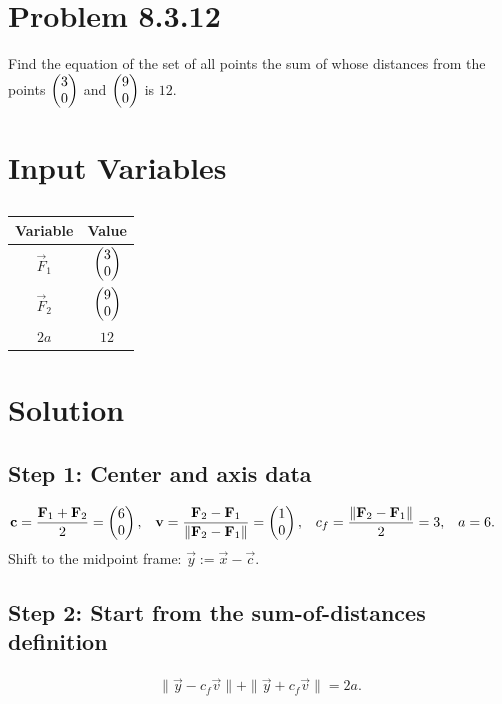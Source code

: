 \documentclass[12pt]{article}
\begin{document}
\section*{Problem 8.3.12}
Find the equation of the set of all points the sum of whose distances 
from the points $\begin{pmatrix}3\\0\end{pmatrix}$ and $\begin{pmatrix}9\\0\end{pmatrix}$ is $12$.

\section*{Input Variables}
\begin{table}[H]
\centering
\begin{tabular}{|c|c|}
\hline
Variable & Value \\
\hline
$\vec F_1$ & $\begin{pmatrix}3\\0\end{pmatrix}$ \\
\hline
$\vec F_2$ & $\begin{pmatrix}9\\0\end{pmatrix}$ \\
\hline
$2a$ & $12$ \\
\hline
\end{tabular}
\caption{} \label{}
\end{table}

\section*{Solution}

\subsection*{Step 1: Center and axis data}
\begin{align}
\mathbf c &= \frac{\mathbf F_1+\mathbf F_2}{2}=\begin{pmatrix}6\\0\end{pmatrix}, &
\mathbf v &= \frac{\mathbf F_2-\mathbf F_1}{\|\mathbf F_2-\mathbf F_1\|}=\begin{pmatrix}1\\0\end{pmatrix}, &
c_f &= \frac{\|\mathbf F_2-\mathbf F_1\|}{2}=3, &
a &= 6.
\end{align}
Shift to the midpoint frame: $\vec y:=\vec x-\vec c$.

\subsection*{Step 2: Start from the sum-of-distances definition}
\begin{align}
\|\vec y-c_f\vec v\|+\|\vec y+c_f\vec v\|=2a.
\end{align}
\end{document}
